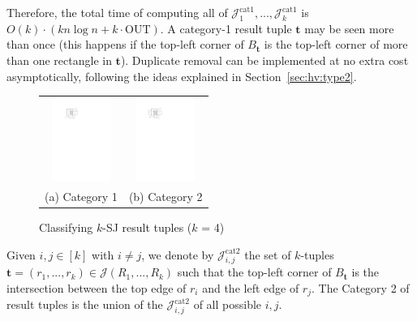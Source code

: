 \documentclass[sigconf]{acmart}
\def\vgap{\vspace{0mm}}
\def\extraspacing{\vspace{1.5mm} \noindent}
\def\figcapup{\vspace{-2mm}}
\def\figcapdown{\vspace{-2mm}}
\def\J{\mathcal{J}}
\def\cat{\mathrm{cat1}}
\def\catt{\mathrm{cat2}}
\def\out{\mathrm{OUT}}
\begin{document}
{{{\vgap 

Therefore, the total time of computing all of $\J^\cat_1, ..., \J^\cat_k$ is $O(k) \cdot (kn \log n + k \cdot \out)$. A category-1 result tuple $\bm{t}$ may be seen more than once (this happens if the top-left corner of $B_\bm{t}$ is the top-left corner of more than one rectangle in $\bm{t}$). Duplicate removal can be implemented at no extra cost asymptotically, following the ideas explained in Section~\ref{sec:hv:type2}.


\begin{figure}
    \begin{tabular}{cc}
        \includegraphics[height=27mm]{./artwork/cat1} &
        \hspace{5mm} \includegraphics[height=27mm]{./artwork/cat2} \\
        (a) Category 1 &
        (b) Category 2
    \end{tabular}

    \figcapup
    \caption{Classifying $k$-SJ result tuples ($k$ = 4)}
    \label{fig:ksj:cats}
    \figcapdown
\end{figure}

\extraspacing {\bf Category 2.} Given $i, j \in [k]$ with $i \ne j$, we denote by $\J^\catt_{i,j}$ the set of $k$-tuples $\bm{t} = (r_1, ..., r_k) \in \J(R_1, ..., R_k)$ such that the top-left corner of $B_\bm{t}$ is the intersection between the top edge of $r_i$ and the left edge of $r_j$. The Category 2 of result tuples is the union of the $\J^\catt_{i,j}$ of all possible $i, j$. 

\vgap 

}}}
\end{document}

